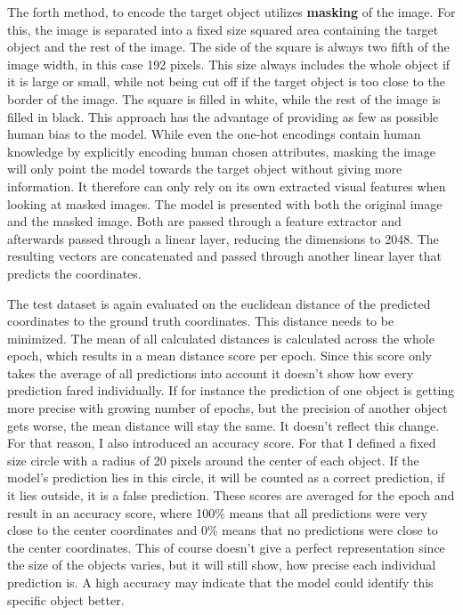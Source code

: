 The forth method, to encode the target object utilizes \textbf{masking} of the image.
For this, the image is separated into a fixed size squared area containing the target object and the rest of the image.
The side of the square is always two fifth of the image width, in this case 192 pixels.
This size always includes the whole object if it is large or small, while not being cut off if the target object is too close to the border of the image.
The square is filled in white, while the rest of the image is filled in black.
This approach has the advantage of providing as few as possible human bias to the model.
While even the one-hot encodings contain human knowledge by explicitly encoding human chosen attributes, masking the image will only point the model towards the target object without giving more information.
It therefore can only rely on its own extracted visual features when looking at masked images.
The model is presented with both the original image and the masked image.
Both are passed through a feature extractor and afterwards passed through a linear layer, reducing the dimensions to 2048.
The resulting vectors are concatenated and passed through another linear layer that predicts the coordinates.

The test dataset is again evaluated on the euclidean distance of the predicted coordinates to the ground truth coordinates.
This distance needs to be minimized.
The mean of all calculated distances is calculated across the whole epoch, which results in a mean distance score per epoch.
Since this score only takes the average of all predictions into account it doesn't show how every prediction fared individually.
If for instance the prediction of one object is getting more precise with growing number of epochs, but the precision of another object gets worse, the mean distance will stay the same.
It doesn't reflect this change.
For that reason, I also introduced an accuracy score.
For that I defined a fixed size circle with a radius of 20 pixels around the center of each object.
If the model's prediction lies in this circle, it will be counted as a correct prediction, if it lies outside, it is a false prediction.
These scores are averaged for the epoch and result in an accuracy score, where 100\% means that all predictions were very close to the center coordinates and 0\% means that no predictions were close to the center coordinates.
This of course doesn't give a perfect representation since the size of the objects varies, but it will still show, how precise each individual prediction is.
A high accuracy may indicate that the model could identify this specific object better.

